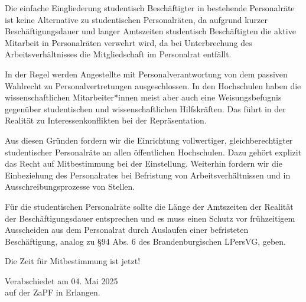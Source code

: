 \documentclass[DIV=calc]{scrartcl}
\begin{document}
Die einfache Eingliederung studentisch Beschäftigter in bestehende Personalräte ist keine Alternative zu studentischen Personalräten, da aufgrund kurzer Beschäftigungsdauer und langer Amtszeiten studentisch Beschäftigten die aktive Mitarbeit in Personalräten verwehrt wird, da bei Unterbrechung des Arbeitsverhältnisses die Mitgliedschaft im Personalrat entfällt.

In der Regel werden Angestellte mit Personalverantwortung von dem passiven Wahlrecht zu Personalvertretungen ausgeschlossen. In den Hochschulen haben die wissenschaftlichen Mitarbeiter*innen meist aber auch eine Weisungsbefugnis gegenüber studentischen und wissenschaftlichen Hilfskräften. Das führt in der Realität zu Interessenkonflikten bei der Repräsentation.

Aus diesen Gründen fordern wir die Einrichtung vollwertiger, gleichberechtigter studentischer Personalräte an allen öffentlichen Hochschulen. Dazu gehört explizit das Recht auf Mitbestimmung bei der Einstellung. Weiterhin fordern wir die
Einbeziehung des Personalrates bei Befristung von Arbeitsverhältnissen und in Ausschreibungsprozesse von Stellen.


Für die studentischen Personalräte sollte die Länge der Amtszeiten der Realität der Beschäftigungsdauer entsprechen und es muss einen Schutz vor frühzeitigem Ausscheiden aus dem Personalrat durch Auslaufen einer befristeten Beschäftigung, analog zu §94 Abs. 6 des Brandenburgischen LPersVG, geben.

Die Zeit für Mitbestimmung ist jetzt!






\vspace{1cm} 
%
\vfill
\begin{flushright}
	Verabschiedet am 04. Mai 2025 \\
	auf der ZaPF in Erlangen.
\end{flushright}
\end{document}
